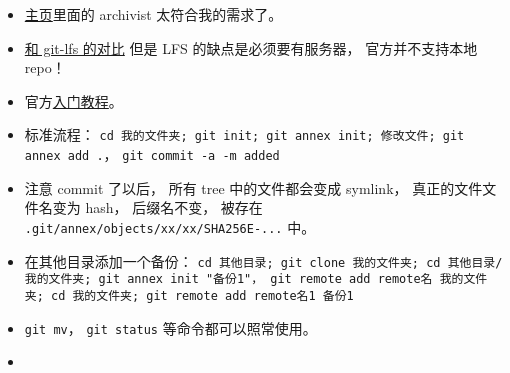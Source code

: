 
\begin{itemize}
\item \href{https://git-annex.branchable.com/}{主页}里面的 archivist 太符合我的需求了。
\item \href{https://stackoverflow.com/questions/39337586/how-do-git-lfs-and-git-annex-differ}{和 git-lfs 的对比} 但是 LFS 的缺点是必须要有服务器， 官方并不支持本地 repo！
\item 官方\href{https://git-annex.branchable.com/walkthrough/}{入门教程}。
\item 标准流程： \verb|cd 我的文件夹; git init; git annex init; 修改文件; git annex add .|， \verb|git commit -a -m added|
\item 注意 commit 了以后， 所有 tree 中的文件都会变成 symlink， 真正的文件文件名变为 hash， 后缀名不变， 被存在 \verb|.git/annex/objects/xx/xx/SHA256E-...| 中。
\item 在其他目录添加一个备份： \verb|cd 其他目录; git clone 我的文件夹; cd 其他目录/我的文件夹; git annex init "备份1"， git remote add remote名 我的文件夹; cd 我的文件夹; git remote add remote名1 备份1|
\item \verb|git mv|， \verb|git status| 等命令都可以照常使用。
\item 
\end{itemize}

